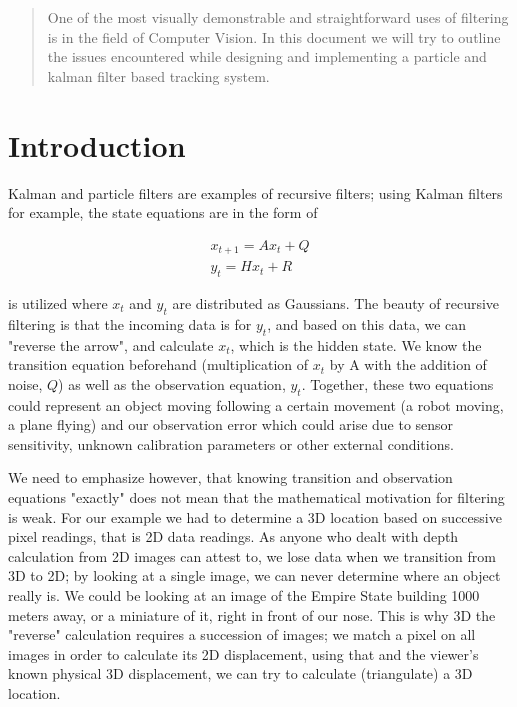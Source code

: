 
\begin{abstract}
One of the most visually demonstrable and straightforward uses of filtering is
in the field of Computer Vision. In this document we will try to outline the
issues encountered while designing and implementing a particle and kalman filter
based tracking system.
\end{abstract}

\section{Introduction}

Kalman and particle filters are examples of recursive filters; using Kalman
filters for example,  the state equations are in the form of 

\begin{eqnarray*}
x_{t+1} = A x_t + Q\\
y_t = Hx_t + R
\end{eqnarray*}

is utilized where $x_t$ and $y_t$ are distributed as Gaussians. The beauty of
recursive filtering is that the incoming data is for $y_t$, and based on this
data, we can "reverse the arrow", and calculate $x_t$, which is the hidden
state. We know the transition equation beforehand (multiplication of $x_t$ by A
with the addition of noise, $Q$) as well as the observation equation,
$y_t$. Together, these two equations could represent an object moving following
a certain movement (a robot moving, a plane flying) and our observation error
which could arise due to sensor sensitivity, unknown calibration parameters or
other external conditions.

We need to emphasize however, that knowing transition and observation equations
"exactly" does not mean that the mathematical motivation for filtering is
weak. For our example we had to determine a 3D location based on successive
pixel readings, that is 2D data readings. As anyone who dealt with depth
calculation from 2D images can attest to, we lose data when we transition from
3D to 2D; by looking at a single image, we can never determine where an object
really is. We could be looking at an image of the Empire State building 1000
meters away, or a miniature of it, right in front of our nose. This is why 3D
the "reverse" calculation requires a succession of images; we match a pixel on
all images in order to calculate its 2D displacement, using that and the
viewer's known physical 3D displacement, we can try to calculate (triangulate) a
3D location.


